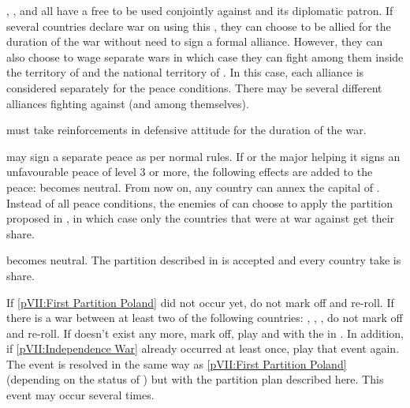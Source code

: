 
\phevnt
\aparag \RUS, \AUS, \PRU and \SUE all have a free \CB to be used conjointly
against \payspologne and its diplomatic patron.
\aparag If several countries declare war on \payspologne using this \CB, they
can choose to be allied for the duration of the war without need to sign a
formal alliance.
\bparag However, they can also choose to wage separate wars in which case they
can fight among them inside the territory of \payspologne and the national
territory of \POL. In this case, each alliance is considered separately for
the peace conditions.
\bparag There may be several different alliances fighting against \payspologne
(and among themselves).

\phadm
\aparag \payspologne must take reinforcements in defensive attitude for the
duration of the war.

\phpaix
\aparag \payspologne may sign a separate peace as per normal rules.
\aparag If \payspologne or the major helping it signs an unfavourable peace of
level 3 or more, the following effects are added to the peace:
\bparag \payspologne becomes neutral.
\bparag From now on, any country can annex the capital of \payspologne.
\bparag Instead of all peace conditions, the enemies of \payspologne can
choose to apply the partition proposed in , in
which case only the countries that were at war against \payspologne get their
share.



\phevnt
\aparag \payspologne becomes neutral.
\aparag The partition described in  is accepted
and every country take is share.





\condition{}
\aparag If \ref{pVII:First Partition Poland} did not occur yet, do not mark
off and re-roll.
\aparag If there is a war between at least two of the following countries:
\RUS, \AUS, \PRU, do not mark off and re-roll.
\aparag If \payspologne doesn't exist any more, mark off, play and \RD with
the \REVOLT in \POL.
\bparag In addition, if \ref{pVII:Independence War} already occurred at least
once, play that event again.
\aparag The event is resolved in the same way as \ref{pVII:First Partition
  Poland} (depending on the status of \payspologne) but with the partition
plan described here.
\aparag This event may occur several times.


